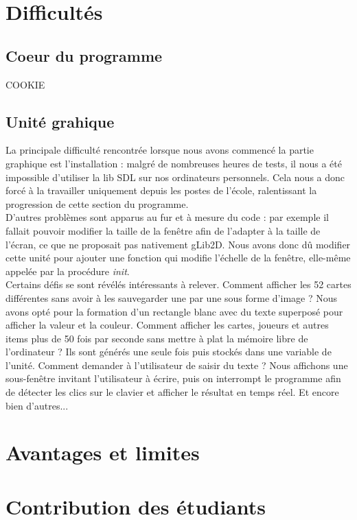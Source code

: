 \documentclass[12pt]{report}
\begin{document}
\section{Difficultés}
	\subsection{Coeur du programme}
	COOKIE
	
	\subsection{Unité grahique}
	La principale difficulté rencontrée lorsque nous avons commencé la partie graphique est l'installation : malgré de nombreuses heures de tests, il nous a été impossible d'utiliser la lib SDL sur nos ordinateurs personnels. Cela nous a donc forcé à la travailler uniquement depuis les postes de l'école, ralentissant la progression de cette section du programme.\\ 
	
	D'autres problèmes sont apparus au fur et à mesure du code : par exemple il fallait pouvoir modifier la taille de la fenêtre afin de l'adapter à la taille de l'écran, ce que ne proposait pas nativement gLib2D. Nous avons donc dû modifier cette unité pour ajouter une fonction qui modifie l'échelle de la fenêtre, elle-même appelée par la procédure \textit{init}. \\
	\clearpage
	Certains défis se sont révélés intéressants à relever. Comment afficher les 52 cartes différentes sans avoir à les sauvegarder une par une sous forme d'image ? Nous avons opté pour la formation d'un rectangle blanc avec du texte superposé pour afficher la valeur et la couleur. Comment afficher les cartes, joueurs et autres items plus de 50 fois par seconde sans mettre à plat la mémoire libre de l'ordinateur ? Ils sont générés une seule fois puis stockés dans une variable de l'unité. Comment demander à l'utilisateur de saisir du texte ? Nous affichons une sous-fenêtre invitant l'utilisateur à écrire, puis on interrompt le programme afin de détecter les clics sur le clavier et afficher le résultat en temps réel. Et encore bien d'autres...

\vspace{15pt}
\section{Avantages et limites}


\section{Contribution des étudiants}
\end{document}
